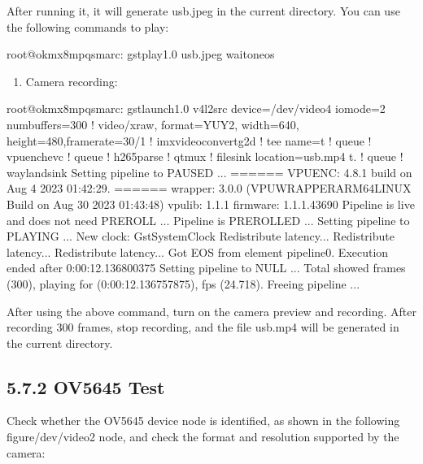 \documentclass[letterpaper,10pt,openany,english]{sphinxmanual}
\begin{document}
\sphinxAtStartPar
After running it, it will generate usb.jpeg in the current directory. You can use the following commands to play:

\begin{sphinxVerbatim}[commandchars=\\\{\}]
root@ok\PYGZhy{}mx8mpq\PYGZhy{}smarc:\PYGZti{}\PYGZsh{} gst\PYGZhy{}play\PYGZhy{}1.0 usb.jpeg \PYGZhy{}\PYGZhy{}wait\PYGZhy{}on\PYGZhy{}eos
\end{sphinxVerbatim}
\begin{enumerate}
%
\setcounter{enumi}{2}
\item {} 
\sphinxAtStartPar
Camera recording:

\end{enumerate}

\begin{sphinxVerbatim}[commandchars=\\\{\}]
root@ok\PYGZhy{}mx8mpq\PYGZhy{}smarc:\PYGZti{}\PYGZsh{} gst\PYGZhy{}launch\PYGZhy{}1.0 v4l2src device=/dev/video4 io\PYGZhy{}mode=2 num\PYGZhy{}buffers=300 ! video/x\PYGZhy{}raw, format=YUY2, width=640, height=480,framerate=30/1 ! imxvideoconvert\PYGZus{}g2d ! tee name=t ! queue ! vpuenc\PYGZus{}hevc ! queue ! h265parse ! qtmux ! filesink location=usb.mp4 t. ! queue ! waylandsink
Setting pipeline to PAUSED ...
====== VPUENC: 4.8.1 build on Aug  4 2023 01:42:29. ======
        wrapper: 3.0.0 (VPUWRAPPER\PYGZus{}ARM64\PYGZus{}LINUX Build on Aug 30 2023 01:43:48)
        vpulib: 1.1.1
        firmware: 1.1.1.43690
Pipeline is live and does not need PREROLL ...
Pipeline is PREROLLED ...
Setting pipeline to PLAYING ...
New clock: GstSystemClock
Redistribute latency...
Redistribute latency...
Redistribute latency...
Got EOS from element \PYGZdq{}pipeline0\PYGZdq{}.
Execution ended after 0:00:12.136800375
Setting pipeline to NULL ...
Total showed frames (300), playing for (0:00:12.136757875), fps (24.718).
Freeing pipeline ...
\end{sphinxVerbatim}

\sphinxAtStartPar
After using the above command, turn on the camera preview and recording. After recording 300 frames, stop recording, and the file usb.mp4 will be generated in the current directory.


\subsection{5.7.2 OV5645 Test}
\label{\detokenize{linux-manual:ov5645-test}}
\sphinxAtStartPar
Check whether the OV5645 device node is identified, as shown in the following figure/dev/video2 node, and check the format and resolution supported by the camera:
\end{document}
